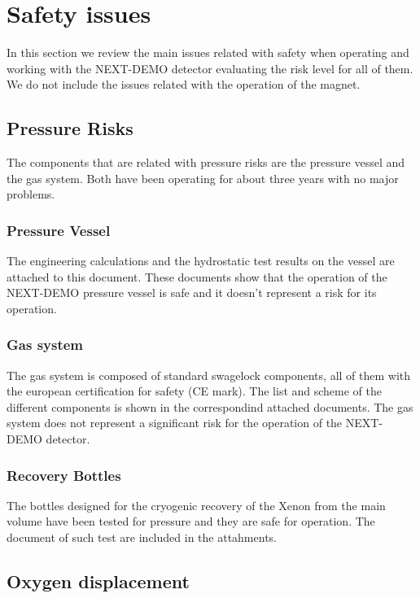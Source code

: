 \section{Safety issues}

In this section we review the main issues related with safety when operating and working with the NEXT-DEMO detector evaluating the risk level for all of them. We do not include the issues related with the operation of the magnet.

\subsection{Pressure Risks}

The components that are related with pressure risks are the pressure vessel and the gas system. Both have been operating for about three years with no major problems.

\subsubsection{Pressure Vessel}
The engineering calculations and the hydrostatic test results on the vessel are attached to this document. These documents show that the operation of the NEXT-DEMO pressure vessel is safe and it doesn't represent a risk for its operation.

\subsubsection{Gas system}
The gas system is composed of standard swagelock components, all of them with the european certification for safety (CE mark). The list and scheme of the different components is shown in the correspondind attached documents. The gas system does not represent a significant risk for the operation of the NEXT-DEMO detector.

\subsubsection{Recovery Bottles}

The bottles designed for the cryogenic recovery of the Xenon from the main volume have been tested for pressure and they are safe for operation. The document of such test are included in the attahments.

\subsection{Oxygen displacement}

